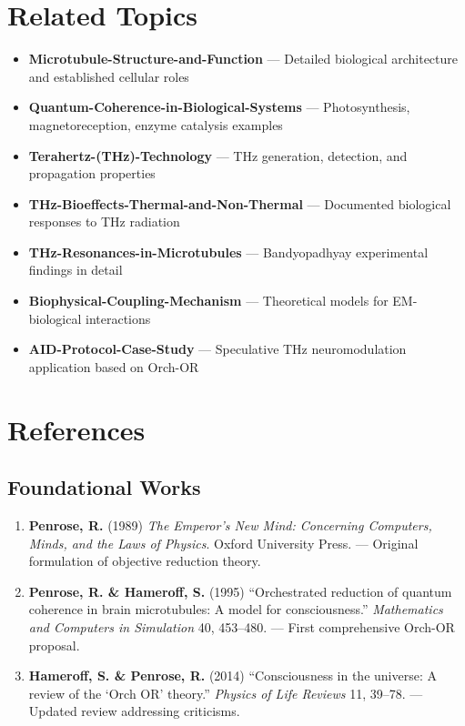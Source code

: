 \section{Related Topics}

\begin{itemize}
\item \textbf{Microtubule-Structure-and-Function} --- Detailed biological architecture and established cellular roles
\item \textbf{Quantum-Coherence-in-Biological-Systems} --- Photosynthesis, magnetoreception, enzyme catalysis examples
\item \textbf{Terahertz-(THz)-Technology} --- THz generation, detection, and propagation properties
\item \textbf{THz-Bioeffects-Thermal-and-Non-Thermal} --- Documented biological responses to THz radiation
\item \textbf{THz-Resonances-in-Microtubules} --- Bandyopadhyay experimental findings in detail
\item \textbf{Biophysical-Coupling-Mechanism} --- Theoretical models for EM-biological interactions
\item \textbf{AID-Protocol-Case-Study} --- Speculative THz neuromodulation application based on Orch-OR
\end{itemize}

\section{References}

\subsection{Foundational Works}

\begin{enumerate}
\item \textbf{Penrose, R.} (1989) \textit{The Emperor's New Mind: Concerning Computers, Minds, and the Laws of Physics}. Oxford University Press. --- Original formulation of objective reduction theory.

\item \textbf{Penrose, R. \& Hameroff, S.} (1995) ``Orchestrated reduction of quantum coherence in brain microtubules: A model for consciousness.'' \textit{Mathematics and Computers in Simulation} 40, 453--480. --- First comprehensive Orch-OR proposal.

\item \textbf{Hameroff, S. \& Penrose, R.} (2014) ``Consciousness in the universe: A review of the `Orch OR' theory.'' \textit{Physics of Life Reviews} 11, 39--78. --- Updated review addressing criticisms.
\end{enumerate}

